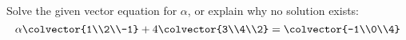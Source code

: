 Solve the given vector equation for $\alpha$, or explain why no solution exists:
%
\begin{equation*}
\alpha\colvector{1\\2\\-1}+
4\colvector{3\\4\\2}
=
\colvector{-1\\0\\4}
\end{equation*}
%